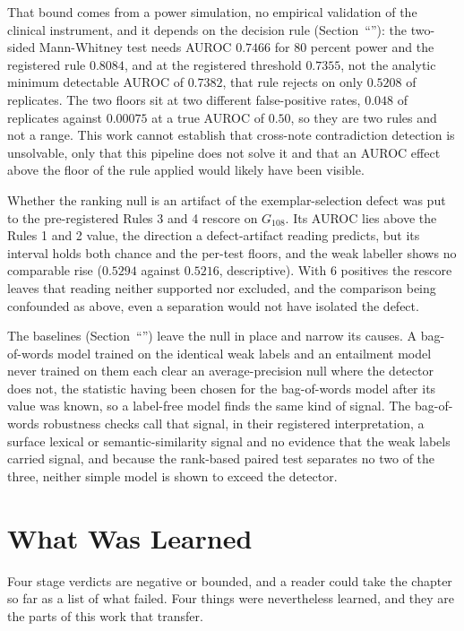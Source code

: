 That bound comes from a power simulation, no empirical validation of the clinical
instrument, and it depends on the decision rule (Section~``''): the
two-sided Mann-Whitney test needs AUROC $0.7466$ for $80$ percent power and the registered
rule $0.8084$, and at the registered threshold $0.7355$, not the analytic minimum detectable
AUROC of $0.7382$, that rule rejects on only $0.5208$ of replicates. The two floors sit at
two different false-positive rates, $0.048$ of replicates against $0.00075$ at a true AUROC
of $0.50$, so they are two rules and not a range. This work cannot establish that cross-note
contradiction detection is unsolvable, only that this pipeline does not solve it and that an
AUROC effect above the floor of the rule applied would likely have been visible.

Whether the ranking null is an artifact of the exemplar-selection defect was put to the pre-registered Rules 3 and 4 rescore on $G_{108}$. Its AUROC lies above the Rules 1 and 2 value,
the direction a defect-artifact reading predicts, but its interval holds both chance and the
per-test floors, and the weak labeller shows no comparable rise ($0.5294$ against $0.5216$,
descriptive). With $6$ positives the rescore leaves that reading neither supported nor
excluded, and the comparison being confounded as above, even a separation would not have
isolated the defect.

The baselines (Section~``'') leave the null in place and narrow its
causes. A bag-of-words model trained on the identical weak labels and an entailment model
never trained on them each clear an average-precision null where the detector does not, the
statistic having been chosen for the bag-of-words model after its value was known, so a
label-free model finds the same kind of signal. The bag-of-words robustness checks call that
signal, in their registered interpretation, a surface lexical or semantic-similarity signal
and no evidence that the weak labels carried signal, and because the rank-based paired test
separates no two of the three, neither simple model is shown to exceed the detector.

\section{What Was Learned}
\label{sec:disc-learned}

Four stage verdicts are negative or bounded, and a reader could take the chapter so far as a list of
what failed. Four things were nevertheless learned, and they are the parts of this work that
transfer.

